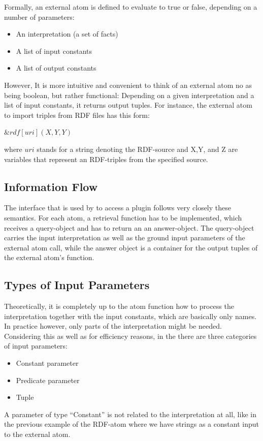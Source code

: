 \documentclass[14pt,a4paper, titlepage]{article}
\newcommand{\ext}[3]{\ensuremath{\&{#1}[#2](#3)}}
\begin{document}
Formally, an external atom is defined to evaluate to true
or false, depending on a number of parameters:
\begin{itemize}
\item An interpretation (a set of facts)
\item A list of input constants
\item A list of output constants
\end{itemize}  
However, It is more intuitive and convenient to think of an 
external atom no as being boolean, but rather functional:
Depending on a given interpretation and a list of input 
constants, it returns output tuples. For instance, the 
external atom to import triples from RDF files has this 
form: \\
\centerline{$\ext{rdf}{uri}{X,Y,Y}$} 
where $\mathit{uri}$ stands for a string denoting the RDF-source and X,Y, and Z are variables that represent an RDF-triples from the specified source.

\subsection{Information Flow}
The interface that is used by \dlvhex{} to access a plugin 
follows very closely these semantics. For each atom, a 
retrieval function has to be implemented, which receives a 
query-object and has to return an an answer-object. The 
query-object carries the input interpretation as well as 
the ground input parameters of the external atom call, 
while the answer object is a container for the output 
tuples of the external atom's function.   

\subsection{Types of Input Parameters}
Theoretically, it is completely up to the atom function how 
to process the interpretation together with the input 
constants,
which are basically only names. In practice however, only 
parts of the interpretation might be needed. Considering 
this as well as for efficiency reasons, in the \dlvhex{} 
there are three categories of input parameters: 
\begin{itemize}
\item Constant parameter
\item Predicate parameter
\item Tuple
\end{itemize}

A parameter of type ``Constant'' is not related to the 
interpretation at all, like in the previous example of the 
RDF-atom where we have strings as a constant input to the external atom. 
\end{document}
